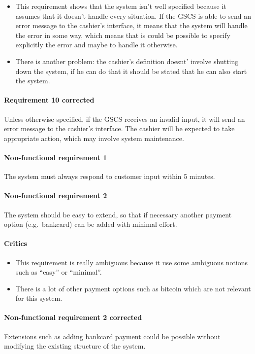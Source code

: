 \begin{framed}
    \begin{itemize}
        \item This requirement shows that the system isn't well specified
        because it assumes that it doesn't handle every situation. If the GSCS
        is able to send an error message to the cashier's interface, it means
        that the system will handle the error in some way, which means that
        is could be possible to specify explicitly the error and maybe to
        handle it otherwise.
        \item There is another problem: the cashier's definition doesnt' involve
        shutting down the system, if he can do that it should be stated that he
        can also start the system.
    \end{itemize}

    \paragraph{Requirement 10 corrected} Unless otherwise specified, if the GSCS
    receives an invalid input, it will send an error message to the cashier's
    interface. The cashier will be expected to take appropriate action, which
    may involve system maintenance.
\end{framed}

\paragraph{Non-functional requirement 1} The system must always respond to
customer input within 5 minutes.

\paragraph{Non-functional requirement 2} The system should be easy to
extend, so that if necessary another payment option (e.g.\ bankcard) can be
added with minimal effort.

\begin{framed}
    \paragraph{Critics}
    \begin{itemize}
        \item This requirement is really ambiguous because it use some
            ambiguous notions such as \enquote{easy} or \enquote{minimal}.

        \item There is a lot of other payment options such as bitcoin
            which are not relevant for this system.
    \end{itemize}
\paragraph{Non-functional requirement 2 corrected} Extensions such as adding
bankcard payment could be possible without modifying the existing structure of
the system.
\end{framed}

